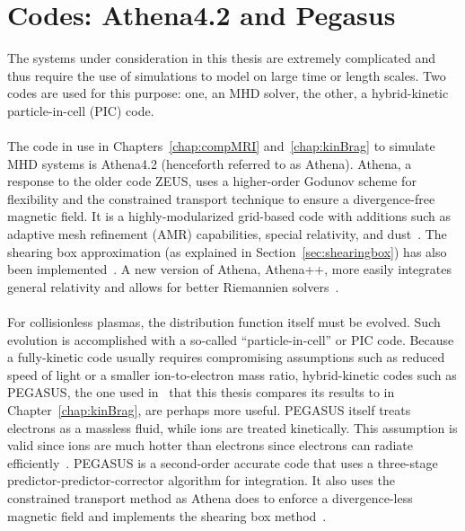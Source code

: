 \section{Codes: Athena4.2 and Pegasus} \label{sec:codes}
The systems under consideration in this thesis are extremely complicated and thus require the use of simulations to model on large time or length scales. Two codes are used for this purpose: one, an MHD solver, the other, a hybrid-kinetic particle-in-cell (PIC) code.\\
\\
The code in use in Chapters~\ref{chap:compMRI} and~\ref{chap:kinBrag} to simulate MHD systems is Athena4.2 (henceforth referred to as Athena). Athena, a response to the older code ZEUS, uses a higher-order Godunov scheme for flexibility and the constrained transport technique to ensure a divergence-free magnetic field. It is a highly-modularized grid-based code with additions such as adaptive mesh refinement (AMR) capabilities, special relativity, and dust~\cite{Stone2008,Stone2009}. The shearing box approximation (as explained in Section~\ref{sec:shearingbox}) has also been implemented~\cite{Stone2010}. A new version of Athena, Athena++, more easily integrates general relativity and allows for better Riemannien solvers~\cite{White2016Thesis,White2016}.\\
\\
For collisionless plasmas, the distribution function itself must be evolved. Such evolution is accomplished with a so-called ``particle-in-cell'' or PIC code. Because a fully-kinetic code usually requires compromising assumptions such as reduced speed of light or a smaller ion-to-electron mass ratio, hybrid-kinetic codes such as PEGASUS, the one used in~\cite{Kunz2016} that this thesis compares its results to in Chapter~\ref{chap:kinBrag}, are perhaps more useful. PEGASUS itself treats electrons as a massless fluid, while ions are treated kinetically. This assumption is valid since ions are much hotter than electrons since electrons can radiate efficiently~\cite{Das2013}. PEGASUS is a second-order accurate code that uses a three-stage predictor-predictor-corrector algorithm for integration. It also uses the constrained transport method as Athena does to enforce a divergence-less magnetic field and implements the shearing box method~\cite{Kunz2014}. 

